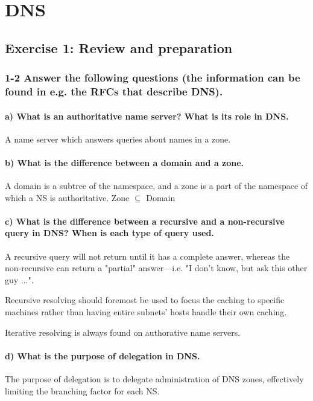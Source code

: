 
\chapter{DNS}
\section{Exercise 1: Review and preparation}
\subsection{1-2 Answer the following questions (the information can be found in e.g. the RFCs that describe DNS).}

\subsubsection{a) What is an authoritative name server? What is its role in DNS.}
A name server which answers queries about names in a zone.

\subsubsection{b) What is the difference between a domain and a zone.}
A domain is a subtree of the namespace, and a zone is a part of the namespace of which a NS is authoritative. Zone $\subseteq$ Domain

\subsubsection{c) What is the difference between a recursive and a non-recursive query in DNS? When is each type of query used.}
A recursive query will not return until it has a complete answer, whereas the non-recursive can return a "partial" answer---i.e. "I don't know, but ask this other guy ...".

Recursive resolving should foremost be used to focus the caching to specific machines rather than having entire subnets' hosts handle their own caching.

Iterative resolving is always found on authorative name servers.

\subsubsection{d) What is the purpose of delegation in DNS.}
The purpose of delegation is to delegate administration of DNS zones, effectively limiting the branching factor for each NS.

